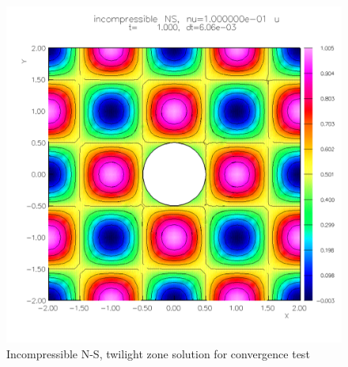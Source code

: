 \documentclass[10pt]{article}
\begin{document}
\begin{figure}[htb]
  \begin{center}
  \includegraphics[width=.7\linewidth]{./fig/ins_cic3_tz}
  \caption{Incompressible N-S, twilight zone solution for convergence test} \label{fig:ins.cic.tz}
  \end{center}
\end{figure}

\clearpage



\clearpage


% 


\vfill\eject




\printindex
\end{document}
